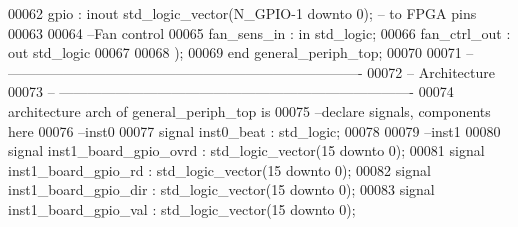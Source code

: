 \begin{DoxyCode}
00062       \textcolor{vhdlchar}{gpio}                 \textcolor{vhdlchar}{:} \textcolor{keywordflow}{inout}  \textcolor{comment}{std\_logic\_vector}\textcolor{vhdlchar}{(}\textcolor{vhdlchar}{N_GPIO}\textcolor{vhdlchar}{-}\textcolor{vhdllogic}{}\textcolor{vhdllogic}{1} \textcolor{keywordflow}{downto} \textcolor{vhdllogic}{}\textcolor{vhdllogic}{0}\textcolor{vhdlchar}{)};\textcolor{keyword}{ -- to FPGA pins}
00063       
00064 \textcolor{keyword}{      --Fan control}
00065       \textcolor{vhdlchar}{fan_sens_in}          \textcolor{vhdlchar}{:} \textcolor{keywordflow}{in}     \textcolor{comment}{std\_logic};
00066       \textcolor{vhdlchar}{fan_ctrl_out}         \textcolor{vhdlchar}{:} \textcolor{keywordflow}{out}    \textcolor{comment}{std\_logic}
00067 
00068    \textcolor{vhdlchar}{)};
00069 \textcolor{keywordflow}{end} \textcolor{vhdlchar}{general\_periph\_top};
00070 
00071 \textcolor{keyword}{-- ----------------------------------------------------------------------------}
00072 \textcolor{keyword}{-- Architecture}
00073 \textcolor{keyword}{-- ----------------------------------------------------------------------------}
00074 \textcolor{keywordflow}{architecture} arch \textcolor{keywordflow}{of} general_periph_top is
00075 \textcolor{keyword}{--declare signals,  components here}
00076 \textcolor{keyword}{--inst0}
00077 \textcolor{keywordflow}{signal} \textcolor{vhdlchar}{inst0_beat} \textcolor{vhdlchar}{:} \textcolor{comment}{std\_logic}; 
00078 
00079 \textcolor{keyword}{--inst1 }
00080 \textcolor{keywordflow}{signal} \textcolor{vhdlchar}{inst1_board_gpio_ovrd}        \textcolor{vhdlchar}{:} \textcolor{comment}{std\_logic\_vector}\textcolor{vhdlchar}{(}\textcolor{vhdllogic}{}\textcolor{vhdllogic}{15} \textcolor{keywordflow}{downto} \textcolor{vhdllogic}{}\textcolor{vhdllogic}{0}\textcolor{vhdlchar}{)};
00081 \textcolor{keywordflow}{signal} \textcolor{vhdlchar}{inst1_board_gpio_rd}          \textcolor{vhdlchar}{:} \textcolor{comment}{std\_logic\_vector}\textcolor{vhdlchar}{(}\textcolor{vhdllogic}{}\textcolor{vhdllogic}{15} \textcolor{keywordflow}{downto} \textcolor{vhdllogic}{}\textcolor{vhdllogic}{0}\textcolor{vhdlchar}{)};
00082 \textcolor{keywordflow}{signal} \textcolor{vhdlchar}{inst1_board_gpio_dir}         \textcolor{vhdlchar}{:} \textcolor{comment}{std\_logic\_vector}\textcolor{vhdlchar}{(}\textcolor{vhdllogic}{}\textcolor{vhdllogic}{15} \textcolor{keywordflow}{downto} \textcolor{vhdllogic}{}\textcolor{vhdllogic}{0}\textcolor{vhdlchar}{)};
00083 \textcolor{keywordflow}{signal} \textcolor{vhdlchar}{inst1_board_gpio_val}         \textcolor{vhdlchar}{:} \textcolor{comment}{std\_logic\_vector}\textcolor{vhdlchar}{(}\textcolor{vhdllogic}{}\textcolor{vhdllogic}{15} \textcolor{keywordflow}{downto} \textcolor{vhdllogic}{}\textcolor{vhdllogic}{0}\textcolor{vhdlchar}{)};

\end{DoxyCode}
